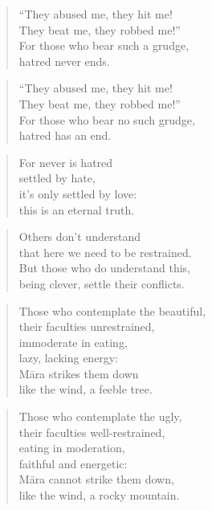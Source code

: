 \documentclass[12pt,openany]{book}%
\begin{document}
\begin{verse}%
“They abused me, they hit me! \\
They beat me, they robbed me!” \\
For those who bear such a grudge, \\
hatred never ends. 

%
\end{verse}

\begin{verse}%
“They abused me, they hit me! \\
They beat me, they robbed me!” \\
For those who bear no such grudge, \\
hatred has an end. 

%
\end{verse}

\begin{verse}%
For never is hatred \\
settled by hate, \\
it’s only settled by love: \\
this is an eternal truth. 

%
\end{verse}

\begin{verse}%
Others don’t understand \\
that here we need to be restrained. \\
But those who do understand this, \\
being clever, settle their conflicts. 

%
\end{verse}

\begin{verse}%
Those who contemplate the beautiful, \\
their faculties unrestrained, \\
immoderate in eating, \\
lazy, lacking energy: \\
\textsanskrit{Māra} strikes them down \\
like the wind, a feeble tree. 

%
\end{verse}

\begin{verse}%
Those who contemplate the ugly, \\
their faculties well-restrained, \\
eating in moderation, \\
faithful and energetic: \\
\textsanskrit{Māra} cannot strike them down, \\
like the wind, a rocky mountain. 

%
\end{verse}
\end{document}
